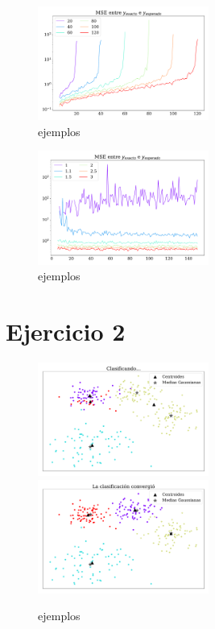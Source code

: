     \begin{figure}[H]
        \centering
        \includegraphics[width=0.5\textwidth]{ejer_1_mse_y_ejemplos.pdf}
        \caption{ejemplos}
        \label{fig:ejer1_y_ejemplos}
    \end{figure}

    \begin{figure}[H]
        \centering
        \includegraphics[width=0.5\textwidth]{ejer_1_mse_y_porcentaje.pdf}
        \caption{ejemplos}
        \label{fig:ejer1_y_porcentaje}
    \end{figure}


    \section*{Ejercicio 2}

    \begin{figure}[H]
        \centering
        \includegraphics[width=0.5\textwidth]{ejer_2_clasificando_a_conv.pdf}
        \includegraphics[width=0.5\textwidth]{ejer_2_si_converge.pdf}
        \caption{ejemplos}
        \label{fig:ejer2_converge}
    \end{figure}

